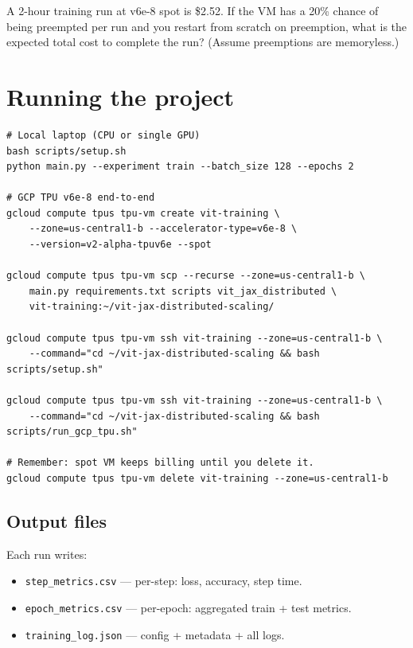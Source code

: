 \documentclass[11pt,a4paper]{article}
\newcounter{exercise}[section]
\newcommand{\answerspace}[1][3]{\vspace{#1\baselineskip}}
\newcommand{\stars}[1]{\textbf{\small(#1)}}
\begin{document}
\begin{exercise}[Economics, \stars{1}]
A 2-hour training run at v6e-8 spot is \$2.52. If the VM has a 20\% chance of being
preempted per run and you restart from scratch on preemption, what is the expected total
cost to complete the run? (Assume preemptions are memoryless.)
\answerspace[3]
\end{exercise}

\section{Running the project}

\begin{lstlisting}[style=sh]
# Local laptop (CPU or single GPU)
bash scripts/setup.sh
python main.py --experiment train --batch_size 128 --epochs 2

# GCP TPU v6e-8 end-to-end
gcloud compute tpus tpu-vm create vit-training \
    --zone=us-central1-b --accelerator-type=v6e-8 \
    --version=v2-alpha-tpuv6e --spot

gcloud compute tpus tpu-vm scp --recurse --zone=us-central1-b \
    main.py requirements.txt scripts vit_jax_distributed \
    vit-training:~/vit-jax-distributed-scaling/

gcloud compute tpus tpu-vm ssh vit-training --zone=us-central1-b \
    --command="cd ~/vit-jax-distributed-scaling && bash scripts/setup.sh"

gcloud compute tpus tpu-vm ssh vit-training --zone=us-central1-b \
    --command="cd ~/vit-jax-distributed-scaling && bash scripts/run_gcp_tpu.sh"

# Remember: spot VM keeps billing until you delete it.
gcloud compute tpus tpu-vm delete vit-training --zone=us-central1-b
\end{lstlisting}

\subsection{Output files}

Each run writes:

\begin{itemize}
\item \texttt{step\_metrics.csv} --- per-step: loss, accuracy, step time.
\item \texttt{epoch\_metrics.csv} --- per-epoch: aggregated train + test metrics.
\item \texttt{training\_log.json} --- config + metadata + all logs.
\end{itemize}
\end{document}
